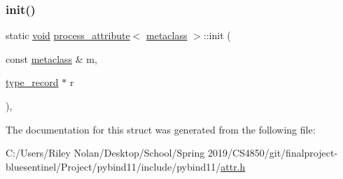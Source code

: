 \subsubsection{\texorpdfstring{init()}{init()}}
{\footnotesize\ttfamily static \mbox{\hyperlink{_s_d_l__opengles2__gl2ext_8h_ae5d8fa23ad07c48bb609509eae494c95}{void}} \mbox{\hyperlink{structprocess__attribute}{process\+\_\+attribute}}$<$ \mbox{\hyperlink{structmetaclass}{metaclass}} $>$\+::init (\begin{DoxyParamCaption}\item[{const \mbox{\hyperlink{structmetaclass}{metaclass}} \&}]{m,  }\item[{\mbox{\hyperlink{structtype__record}{type\+\_\+record}} $\ast$}]{r }\end{DoxyParamCaption})\hspace{0.3cm}{\ttfamily [inline]}, {\ttfamily [static]}}



The documentation for this struct was generated from the following file\+:\begin{DoxyCompactItemize}
\item 
C\+:/\+Users/\+Riley Nolan/\+Desktop/\+School/\+Spring 2019/\+C\+S4850/git/finalproject-\/bluesentinel/\+Project/pybind11/include/pybind11/\mbox{\hyperlink{attr_8h}{attr.\+h}}\end{DoxyCompactItemize}

